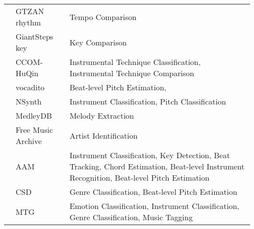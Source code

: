 \begin{longtable}{p{2cm}p{6cm}p{6cm}}
                           & GTZAN rhythm \cite{marchand2015gtzan}  & Tempo Comparison \\  %
                           & GiantSteps key \cite{knees2015two}  & Key Comparison \\  %
                           & CCOM-HuQin \cite{zhang2022ccom}  & Instrumental Technique Classification, Instrumental Technique Comparison \\  %
                           & vocadito \cite{bittner2021vocadito}  & Beat-level Pitch Estimation, \\  %
                           & NSynth \cite{engel2017neural}  & Instrument Classification, Pitch Classification \\  %
                           & MedleyDB \cite{bittner2014medleydb}  & Melody Extraction \\  %
                           & Free Music Archive \cite{fma_dataset}  & Artist Identification \\  %
                           & AAM \cite{ostermann2023aam}  & Instrument Classification, Key Detection, Beat Tracking, Chord Estimation, Beat-level Instrument Recognition, Beat-level Pitch Estimation \\  %
                           & CSD \cite{choi2020children}  & Genre Classification, Beat-level Pitch Estimation \\  %
                           & MTG \cite{bogdanov2019mtg}  & Emotion Classification, Instrument Classification, Genre Classification, Music Tagging \\  %


\end{longtable}
